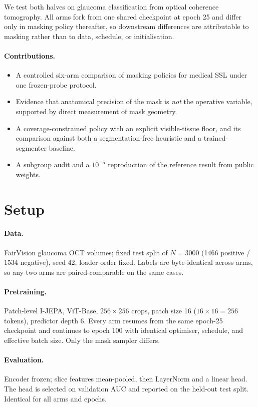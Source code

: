 \documentclass{article}
\begin{document}
We test both halves on glaucoma classification from optical coherence
tomography. All arms fork from one shared checkpoint at epoch 25 and differ only
in masking policy thereafter, so downstream differences are attributable to
masking rather than to data, schedule, or initialisation.

\paragraph{Contributions.}
\begin{itemize}
\item A controlled six-arm comparison of masking policies for medical SSL under
      one frozen-probe protocol.
\item Evidence that anatomical precision of the mask is \emph{not} the operative
      variable, supported by direct measurement of mask geometry.
\item A coverage-constrained policy with an explicit visible-tissue floor, and
      its comparison against both a segmentation-free heuristic and a
      trained-segmenter baseline.
\item A subgroup audit and a $10^{-5}$ reproduction of the reference result from
      public weights.
\end{itemize}

\section{Setup}

\paragraph{Data.} FairVision glaucoma OCT volumes; fixed test split of
$N{=}3000$ (1466 positive / 1534 negative), seed 42, loader order fixed. Labels
are byte-identical across arms, so any two arms are paired-comparable on the
same cases.

\paragraph{Pretraining.} Patch-level I-JEPA, ViT-Base, $256{\times}256$ crops,
patch size 16 ($16{\times}16{=}256$ tokens), predictor depth 6. Every arm resumes
from the same epoch-25 checkpoint and continues to epoch 100 with identical
optimiser, schedule, and effective batch size. Only the mask sampler differs.

\paragraph{Evaluation.} Encoder frozen; slice features mean-pooled, then
LayerNorm and a linear head. The head is selected on validation AUC and reported
on the held-out test split. Identical for all arms and epochs.
\end{document}
